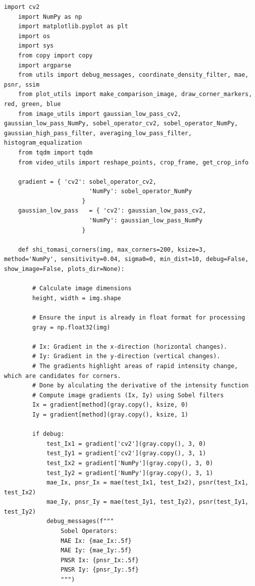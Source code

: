\documentclass[11pt, conference, letterpaper]{IEEEtran}
\begin{document}
\begin{lstlisting}[style=python, caption={\texttt{shi\_tomasi\_corners.py}}, label={lst:stc}]
    import cv2
    import NumPy as np
    import matplotlib.pyplot as plt
    import os
    import sys
    from copy import copy
    import argparse
    from utils import debug_messages, coordinate_density_filter, mae, psnr, ssim
    from plot_utils import make_comparison_image, draw_corner_markers, red, green, blue
    from image_utils import gaussian_low_pass_cv2, gaussian_low_pass_NumPy, sobel_operator_cv2, sobel_operator_NumPy, gaussian_high_pass_filter, averaging_low_pass_filter, histogram_equalization
    from tqdm import tqdm
    from video_utils import reshape_points, crop_frame, get_crop_info
    
    gradient = { 'cv2': sobel_operator_cv2,
                        'NumPy': sobel_operator_NumPy
                      }
    gaussian_low_pass   = { 'cv2': gaussian_low_pass_cv2,
                        'NumPy': gaussian_low_pass_NumPy
                      }
    
    def shi_tomasi_corners(img, max_corners=200, ksize=3, method='NumPy', sensitivity=0.04, sigma0=0, min_dist=10, debug=False, show_image=False, plots_dir=None):
        
        # Calculate image dimensions
        height, width = img.shape
        
        # Ensure the input is already in float format for processing
        gray = np.float32(img)
            
        # Ix: Gradient in the x-direction (horizontal changes).
        # Iy: Gradient in the y-direction (vertical changes).
        # The gradients highlight areas of rapid intensity change, which are candidates for corners.
        # Done by alculating the derivative of the intensity function
        # Compute image gradients (Ix, Iy) using Sobel filters
        Ix = gradient[method](gray.copy(), ksize, 0)
        Iy = gradient[method](gray.copy(), ksize, 1)
        
        if debug:
            test_Ix1 = gradient['cv2'](gray.copy(), 3, 0)
            test_Iy1 = gradient['cv2'](gray.copy(), 3, 1)
            test_Ix2 = gradient['NumPy'](gray.copy(), 3, 0)
            test_Iy2 = gradient['NumPy'](gray.copy(), 3, 1)
            mae_Ix, pnsr_Ix = mae(test_Ix1, test_Ix2), psnr(test_Ix1, test_Ix2)
            mae_Iy, pnsr_Iy = mae(test_Iy1, test_Iy2), psnr(test_Iy1, test_Iy2)
            debug_messages(f"""
                Sobel Operators:
                MAE Ix: {mae_Ix:.5f}
                MAE Iy: {mae_Iy:.5f}
                PNSR Ix: {pnsr_Ix:.5f}
                PNSR Iy: {pnsr_Iy:.5f}
                """)
            

\end{lstlisting}
\end{document}
